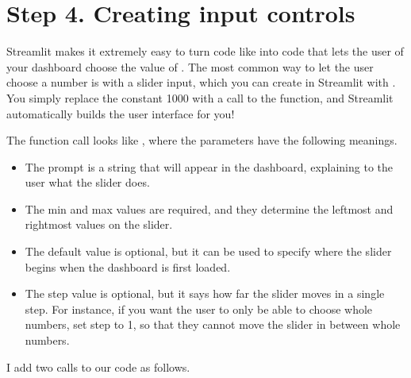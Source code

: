 \documentclass[letterpaper,10pt,english]{jupyterBook}
\begin{document}
\section{Step 4. Creating input controls}
\label{\detokenize{chapter-14-dashboards:step-4-creating-input-controls}}
\sphinxAtStartPar
Streamlit makes it extremely easy to turn code like  into code that lets the user of your dashboard choose the value of .  The most common way to let the user choose a number is with a slider input, which you can create in Streamlit with .  You simply replace the constant 1000 with a call to the  function, and Streamlit automatically builds the user interface for you!

\sphinxAtStartPar
The function call looks like , where the parameters have the following meanings.
\begin{itemize}
\item {} 
\sphinxAtStartPar
The prompt is a string that will appear in the dashboard, explaining to the user what the slider does.

\item {} 
\sphinxAtStartPar
The min and max values are required, and they determine the leftmost and rightmost values on the slider.

\item {} 
\sphinxAtStartPar
The default value is optional, but it can be used to specify where the slider begins when the dashboard is first loaded.

\item {} 
\sphinxAtStartPar
The step value is optional, but it says how far the slider moves in a single step.  For instance, if you want the user to only be able to choose whole numbers, set step to 1, so that they cannot move the slider in between whole numbers.

\end{itemize}

\sphinxAtStartPar
I add two  calls to our code as follows.
\end{document}
